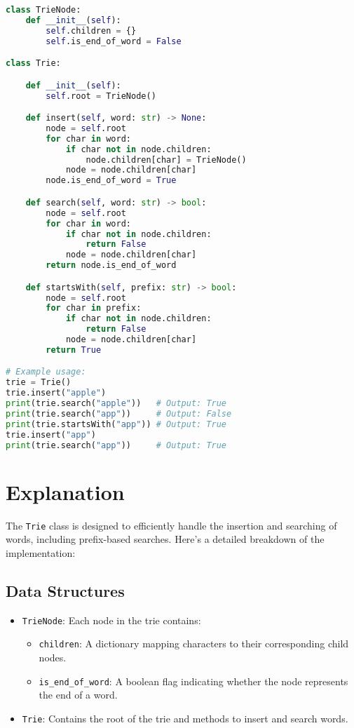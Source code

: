 \begin{fullwidth}
\begin{lstlisting}[language=Python]
class TrieNode:
    def __init__(self):
        self.children = {}
        self.is_end_of_word = False

class Trie:

    def __init__(self):
        self.root = TrieNode()

    def insert(self, word: str) -> None:
        node = self.root
        for char in word:
            if char not in node.children:
                node.children[char] = TrieNode()
            node = node.children[char]
        node.is_end_of_word = True

    def search(self, word: str) -> bool:
        node = self.root
        for char in word:
            if char not in node.children:
                return False
            node = node.children[char]
        return node.is_end_of_word

    def startsWith(self, prefix: str) -> bool:
        node = self.root
        for char in prefix:
            if char not in node.children:
                return False
            node = node.children[char]
        return True

# Example usage:
trie = Trie()
trie.insert("apple")
print(trie.search("apple"))   # Output: True
print(trie.search("app"))     # Output: False
print(trie.startsWith("app")) # Output: True
trie.insert("app")
print(trie.search("app"))     # Output: True
\end{lstlisting}
\end{fullwidth}

\section*{Explanation}

The \texttt{Trie} class is designed to efficiently handle the insertion and searching of words, including prefix-based searches. Here's a detailed breakdown of the implementation:

\subsection*{Data Structures}
\begin{itemize}
    \item \texttt{TrieNode}:  
    Each node in the trie contains:
    \begin{itemize}
        \item \texttt{children}: A dictionary mapping characters to their corresponding child nodes.
        \item \texttt{is\_end\_of\_word}: A boolean flag indicating whether the node represents the end of a word.
    \end{itemize}
    
    \item \texttt{Trie}:  
    Contains the root of the trie and methods to insert and search words.
\end{itemize}

